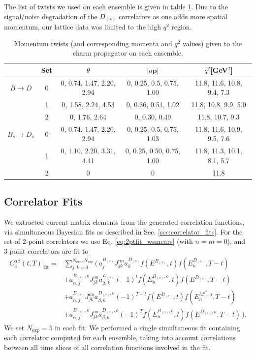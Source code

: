 The list of twists we used on each ensemble is given in table \ref{tab:nrqcd_twists}. Due to the signal/noise degradation of the $D_{(s)}$ correlators as one adds more spatial momentum, our lattice data was limited to the high $q^2$ region.

\begin{table}[htb!]
  \vspace{10pt}
  \hspace{-20pt}
 \begin{tabular}{c c c c c}
 \hline
 & Set & $\theta$ & $|a{\textbf{p}}|$ & $q^2$[GeV$^2$] \\ [0.5ex] 
 \hline
 $B\to D$ & 0 & 0, 0.74, 1.47, 2.20, 2.94 & 0, 0.25, 0.5, 0.75, 1.00 & 11.8, 11.6, 10.8, 9.4, 7.3 \\ [1ex]
 & 1 & 0, 1.58, 2.24, 4.53 & 0, 0.36, 0.51, 1.02 & 11.8, 10.8, 9.9, 5.0  \\ [1ex]
 & 2 & 0, 1.76, 2.64 & 0, 0.30, 0.49 & 11.8, 10.7, 9.3 \\ [1ex]
 \hline
 $B_s\to D_s$ & 0 & 0, 0.74, 1.47, 2.20, 2.94 & 0, 0.25, 0.5, 0.75, 1.03 & 11.8, 11.6, 10.9, 9.5, 7.6 \\ [1ex]
 & 1 & 0, 1.10, 2.20, 3.31, 4.41 & 0, 0.25, 0.50, 0.75, 1.00 & 11.8, 11.3, 10.1, 8.1, 5.7 \\ [1ex]
 & 2 & 0 & 0 & 11.8\\  [1ex]
 \hline
\end{tabular}
 \caption{Momentum twists (and corresponding momenta and $q^2$ values) given to the charm propagator on each ensemble. \label{tab:nrqcd_twists} }
\end{table}

\subsection{Correlator Fits}

We extracted current matrix elements from the generated correlation functions, via simultaneous Bayesian fits as described in Sec. \ref{sec:correlator_fits}. For the set of 2-point correlators we use Eq. \eqref{eq:2ptfit_wsmears} (with $n=m=0$), and 3-point correlators are fit to
\begin{align}
  \nonumber
  C^{\alpha\beta}_{3}(t,T)|_{\text{fit}} =& \sum_{j,k=0}^{N_{\text{exp}},N_{\text{exp}}} \Big(\, a^{B_{(s)}}_j J^{nn}_{jk} a^{D_{(s)}}_k f(E^{B_{(s)}},t) f(E^{D_{(s)}}_n,T-t)
  \\ \nonumber
  &+a^{B_{(s)},o}_{\alpha,j} J^{on}_{jk} a_{\beta,k}^{D_{(s)}} (-1)^t f(E^{B_{(s)},o}_n,t) f(E^{D_{(s)}},T-t)
  \\ \nonumber
  &+a_{\alpha,j}^{B_{(s)}} J^{no}_{jk} a_{\beta,k}^{D_{(s)},o} (-1)^{T-t} f(E^{B_{(s)}},t) f(E^{M'^*,o}_n,T-t)
  \\
  &+a_{\alpha,j}^{B_{(s)},o} J^{oo}_{jk} a_{\beta,k}^{D_{(s)},o} (-1)^T f(E^{B_{(s)},o}_n,t) f(E^{D_{(s)},o},T-t) \,\Big).
  \label{eq:3ptcorrelator_real}
\end{align}
We set $N_{\text{exp}}=5$ in each fit. We performed a single simultaneous fit containing each correlator computed for each ensemble, taking into account correlations between all time slices of all correlation functions involved in the fit.

